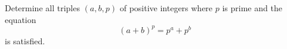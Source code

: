 Determine all triples $(a,b,p)$ of positive integers where $p$ is prime and the equation
$$(a+b)^p = p^a + p^b$$
is satisfied.
